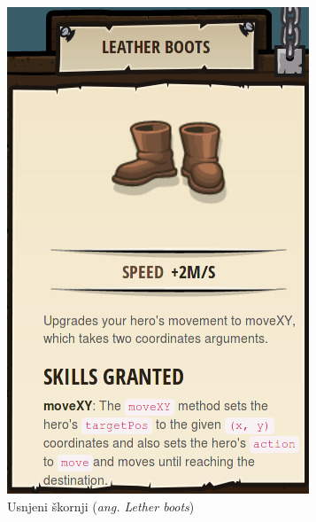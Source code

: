 \begin{figure}[h!]
\begin{subfigure}[]{0.25\textwidth}
        \includegraphics[width=\textwidth]{./images/sc_web/cc_EQ-LB-v01.jpg}
        \caption{Usnjeni škornji (\emph{ang. Lether boots})}
        \label{fig:cc:eq:lb}
    \end{subfigure}
    \\
    \begin{subfigure}[]{0.25\textwidth}

\end{subfigure}
\end{figure}
